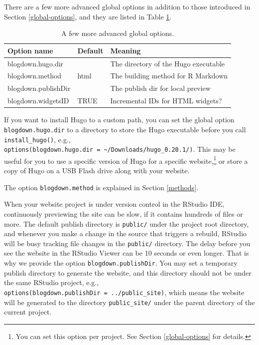 \documentclass[12pt,]{krantz}
\theoremstyle{definition}
\theoremstyle{definition}
\theoremstyle{definition}
\theoremstyle{remark}
\begin{document}
There are a few more advanced global options in
addition to those introduced in Section \ref{global-options}, and they
are listed in Table \ref{tab:global-options2}.

\begin{table}

\caption{\label{tab:global-options2}A few more advanced global options.}
\centering
\begin{tabular}[t]{lll}
\toprule
Option name & Default & Meaning\\
\midrule
blogdown.hugo.dir &  & The directory of the Hugo executable\\
blogdown.method & html & The building method for R Markdown\\
blogdown.publishDir &  & The publish dir for local preview\\
blogdown.widgetsID & TRUE & Incremental IDs for HTML widgets?\\
\bottomrule
\end{tabular}
\end{table}

If you want to install Hugo to a custom path, you can set the global
option \texttt{blogdown.hugo.dir} to a directory to store the Hugo
executable before you call \texttt{install\_hugo()}, e.g.,
\texttt{options(blogdown.hugo.dir\ =\ \textquotesingle{}\textasciitilde{}/Downloads/hugo\_0.20.1/\textquotesingle{})}.
This may be useful for you to use a specific version of Hugo for a
specific website,\footnote{You can set this option per project. See
  Section \ref{global-options} for details.} or store a copy of Hugo on
a USB Flash drive along with your website.

The option \texttt{blogdown.method} is explained in Section
\ref{methods}.

When your website project is under version control in the RStudio IDE,
continuously previewing the site can be slow, if it contains hundreds of
files or more. The default publish directory is \texttt{public/} under
the project root directory, and whenever you make a change in the source
that triggers a rebuild, RStudio will be busy tracking file changes in
the \texttt{public/} directory. The delay before you see the website in
the RStudio Viewer can be 10 seconds or even longer. That is why we
provide the option \texttt{blogdown.publishDir}. You may set a temporary
publish directory to generate the website, and this directory should not
be under the same RStudio project, e.g.,
\texttt{options(blogdown.publishDir\ =\ \textquotesingle{}../public\_site\textquotesingle{})},
which means the website will be generated to the directory
\texttt{public\_site/} under the parent directory of the current
project.
\end{document}
